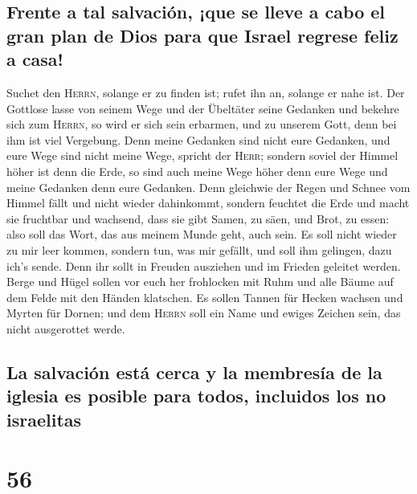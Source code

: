 \hypertarget{frente-a-tal-salvaciuxf3n-que-se-lleve-a-cabo-el-gran-plan-de-dios-para-que-israel-regrese-feliz-a-casa}{%
\subsection{Frente a tal salvación, ¡que se lleve a cabo el gran plan de
Dios para que Israel regrese feliz a
casa!}\label{frente-a-tal-salvaciuxf3n-que-se-lleve-a-cabo-el-gran-plan-de-dios-para-que-israel-regrese-feliz-a-casa}}

 Suchet den \textsc{Herrn}, solange er zu finden ist;
rufet ihn an, solange er nahe ist.  Der Gottlose lasse von
seinem Wege und der Übeltäter seine Gedanken und bekehre sich zum
\textsc{Herrn}, so wird er sich sein erbarmen, und zu unserem Gott, denn
bei ihm ist viel Vergebung.  Denn meine Gedanken sind
nicht eure Gedanken, und eure Wege sind nicht meine Wege, spricht der
\textsc{Herr};  sondern soviel der Himmel höher ist denn
die Erde, so sind auch meine Wege höher denn eure Wege und meine
Gedanken denn eure Gedanken.  Denn gleichwie der Regen
und Schnee vom Himmel fällt und nicht wieder dahinkommt, sondern
feuchtet die Erde und macht sie fruchtbar und wachsend, dass sie gibt
Samen, zu säen, und Brot, zu essen:  also soll das Wort,
das aus meinem Munde geht, auch sein. Es soll nicht wieder zu mir leer
kommen, sondern tun, was mir gefällt, und soll ihm gelingen, dazu ich's
sende.  Denn ihr sollt in Freuden ausziehen und im
Frieden geleitet werden. Berge und Hügel sollen vor euch her frohlocken
mit Ruhm und alle Bäume auf dem Felde mit den Händen klatschen.
 Es sollen Tannen für Hecken wachsen und Myrten für
Dornen; und dem \textsc{Herrn} soll ein Name und ewiges Zeichen sein,
das nicht ausgerottet werde.

\hypertarget{la-salvaciuxf3n-estuxe1-cerca-y-la-membresuxeda-de-la-iglesia-es-posible-para-todos-incluidos-los-no-israelitas}{%
\subsection{La salvación está cerca y la membresía de la iglesia es
posible para todos, incluidos los no
israelitas}\label{la-salvaciuxf3n-estuxe1-cerca-y-la-membresuxeda-de-la-iglesia-es-posible-para-todos-incluidos-los-no-israelitas}}

\hypertarget{section-55}{%
\section{56}\label{section-55}}

